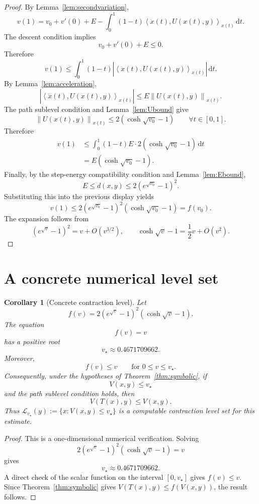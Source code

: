\documentclass[11pt]{article}
\newtheorem{corollary}{Corollary}
\newcommand{\ip}[2]{\left\langle #1,#2\right\rangle}
\newcommand{\norm}[1]{\left\lVert #1\right\rVert}
\newcommand{\dd}{\mathrm d}
\begin{document}
\begin{proof}
By Lemma~\ref{lem:secondvariation},
\[
    v(1)
    =
    v_0+v'(0)+E
    -
    \int_0^1(1-t)\ip{\ddot x(t)}{U(x(t),y)}_{x(t)}\,\dd t.
\]
The descent condition implies
\[
    v_0+v'(0)+E\le0.
\]
Therefore
\[
    v(1)
    \le
    \int_0^1(1-t)
    |\ip{\ddot x(t)}{U(x(t),y)}_{x(t)}|\,\dd t.
\]
By Lemma~\ref{lem:acceleration},
\[
    |\ip{\ddot x(t)}{U(x(t),y)}_{x(t)}|
    \le
    E\norm{U(x(t),y)}_{x(t)}.
\]
The path sublevel condition and Lemma~\ref{lem:Ubound} give
\[
    \norm{U(x(t),y)}_{x(t)}
    \le
    2(\cosh\sqrt{v_0}-1)
    \qquad
    \forall t\in[0,1].
\]
Therefore
\[
\begin{aligned}
    v(1)
    &\le
    \int_0^1(1-t)
    E\cdot 2(\cosh\sqrt{v_0}-1)\,\dd t \\
    &=
    E(\cosh\sqrt{v_0}-1).
\end{aligned}
\]
Finally, by the step-energy compatibility condition and Lemma~\ref{lem:Ebound},
\[
    E\le d(x,y)
    \le
    2(e^{\sqrt{v_0}}-1)^2.
\]
Substituting this into the previous display yields
\[
    v(1)
    \le
    2(e^{\sqrt{v_0}}-1)^2(\cosh\sqrt{v_0}-1)
    =f(v_0).
\]
The expansion follows from
\[
    (e^{\sqrt v}-1)^2=v+O(v^{3/2}),
    \qquad
    \cosh\sqrt v-1=\frac12v+O(v^2).
\]
\end{proof}

\section{A concrete numerical level set}

\begin{corollary}[Concrete contraction level]
Let
\[
    f(v)
    =
    2\left(e^{\sqrt v}-1\right)^2
    \left(\cosh\sqrt v-1\right).
\]
The equation
\[
    f(v)=v
\]
has a positive root
\[
    v_\star
    \approx
    0.4671709662.
\]
Moreover,
\[
    f(v)\le v
    \qquad
    \text{for }0\le v\le v_\star.
\]
Consequently, under the hypotheses of Theorem~\ref{thm:symbolic}, if
\[
    V(x,y)\le v_\star
\]
and the path sublevel condition holds, then
\[
    V(T(x),y)\le V(x,y).
\]
Thus $\mathcal L_{v_\star}(y):=\{x:V(x,y)\le v_\star\}$ is a computable contraction level set for this estimate.
\end{corollary}

\begin{proof}
This is a one-dimensional numerical verification.  Solving
\[
    2(e^{\sqrt v}-1)^2(\cosh\sqrt v-1)=v
\]
gives
\[
    v_\star\approx0.4671709662.
\]
A direct check of the scalar function on the interval $[0,v_\star]$ gives
$f(v)\le v$.  Since Theorem~\ref{thm:symbolic} gives
$V(T(x),y)\le f(V(x,y))$, the result follows.
\end{proof}
\end{document}
